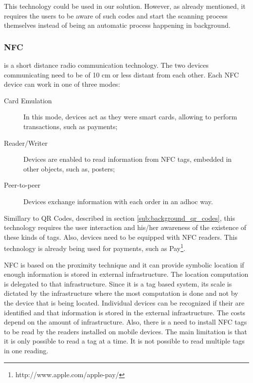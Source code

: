 This technology could be used in our solution.
However, as already mentioned, it requires the users to be aware of such codes and start the scanning process themselves instead of being an automatic process happening in background.

\subsubsection{NFC}
\label{sub:background_near_field _communication}
 is a short distance radio communication technology.
The two devices communicating need to be of 10 cm or less distant from each other.
Each \gls{NFC} device can work in one of three modes:
\begin{description}
  \item[Card Emulation] In this mode, devices act as they were smart cards, allowing to perform transactions, such as payments;
  \item[Reader/Writer] Devices are enabled to read information from \gls{NFC} tags, embedded in other objects, such as, posters;
  \item[Peer-to-peer] Devices exchange information with each order in an adhoc way.
\end{description}

Simillary to \gls{QR} Codes, described in section \ref{sub:background_qr_codes}, this technology requires the user interaction and his/her awareness of the existence of these kinds of tags.
Also, devices need to be equipped with \gls{NFC} readers.
This technology is already being used for payments, such as  Pay\footnote{http://www.apple.com/apple-pay/}.

\gls{NFC} is based on the proximity technique and it can provide symbolic location if enough information is stored in external infrastructure.
The location computation is delegated to that infrastructure.
Since it is a tag based system, its scale is dictated by the infrastructure where the most computation is done and not by the device that is being located.
Individual devices can be recognized if their are identified and that information is stored in the external infrastructure.
The costs depend on the amount of infrastructure. Also, there is a need to install \gls{NFC} tags to be read by the readers installed on mobile devices.
The main limitation is that it is only possible to read a tag at a time. It is not possible to read multiple tags in one reading.

